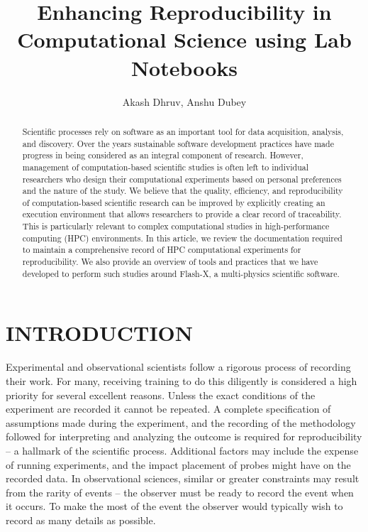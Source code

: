 \documentclass{IEEEcsmag}
\begin{document}
\title{Enhancing Reproducibility in Computational Science using Lab Notebooks}
   
\author{ Akash Dhruv, Anshu Dubey}


\begin{abstract}
%
Scientific processes rely on software as an important tool for data acquisition, analysis, and discovery. Over the years sustainable software development practices have made progress in being considered as an integral component of research. However, management of computation-based scientific studies is often left to individual researchers who design their computational experiments based on personal preferences and the nature of the study. We believe that the quality, efficiency, and reproducibility of computation-based scientific research can be improved by explicitly creating an execution environment that allows researchers to provide a clear record of traceability. This is particularly relevant to complex computational studies in high-performance computing (HPC) environments. In this article, we review the documentation required to maintain a comprehensive record of  HPC computational experiments for reproducibility. We also provide an overview of tools and practices that we have developed to perform such studies around Flash-X, a multi-physics scientific software.

\end{abstract}

\maketitle

\section{INTRODUCTION}
Experimental and observational scientists follow a rigorous process of recording their work. For many, receiving training to do this diligently is considered a high priority for several excellent reasons. Unless the exact conditions of the experiment are recorded it cannot be repeated. A complete specification of assumptions made during the experiment, and the recording of the methodology followed for
interpreting and analyzing the outcome is required for
reproducibility -- a hallmark of the scientific
process. Additional factors may include the expense of running experiments, and the impact placement of probes might have on the recorded data.  In observational sciences, similar or greater constraints may result from the rarity of events -- the observer
must be ready to record the event when it occurs. To make the most of the event the observer would typically
wish to record as many details as possible.
\end{document}
